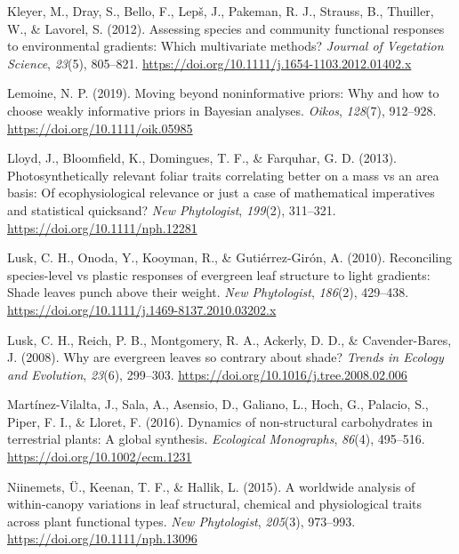 \documentclass[
  12pt,
  a4paper,
,tablecaptionabove
]{scrartcl}
\newlength{\cslhangindent}
\newenvironment{CSLReferences}[2] %
 {%
  \setlength{\parindent}{0pt}
  \ifodd #1 \everypar{\setlength{\hangindent}{\cslhangindent}}\ignorespaces\fi
  \ifnum #2 > 0
  \setlength{\parskip}{#2\baselineskip}
  \fi
 }%
 {}
\begin{document}
\begin{CSLReferences}{1}{0}
\leavevmode{}%
Kleyer, M., Dray, S., Bello, F., Lepš, J., Pakeman, R. J., Strauss, B.,
Thuiller, W., \& Lavorel, S. (2012). Assessing species and community
functional responses to environmental gradients: {Which} multivariate
methods? \emph{Journal of Vegetation Science}, \emph{23}(5), 805--821.
\url{https://doi.org/10.1111/j.1654-1103.2012.01402.x}

\leavevmode{}%
Lemoine, N. P. (2019). Moving beyond noninformative priors: Why and how
to choose weakly informative priors in {Bayesian} analyses.
\emph{Oikos}, \emph{128}(7), 912--928.
\url{https://doi.org/10.1111/oik.05985}

\leavevmode{}%
Lloyd, J., Bloomfield, K., Domingues, T. F., \& Farquhar, G. D. (2013).
Photosynthetically relevant foliar traits correlating better on a mass
vs an area basis: {Of} ecophysiological relevance or just a case of
mathematical imperatives and statistical quicksand? \emph{New
Phytologist}, \emph{199}(2), 311--321.
\url{https://doi.org/10.1111/nph.12281}

\leavevmode{}%
Lusk, C. H., Onoda, Y., Kooyman, R., \& Gutiérrez-Girón, A. (2010).
Reconciling species-level vs plastic responses of evergreen leaf
structure to light gradients: {Shade} leaves punch above their weight.
\emph{New Phytologist}, \emph{186}(2), 429--438.
\url{https://doi.org/10.1111/j.1469-8137.2010.03202.x}

\leavevmode{}%
Lusk, C. H., Reich, P. B., Montgomery, R. A., Ackerly, D. D., \&
Cavender-Bares, J. (2008). Why are evergreen leaves so contrary about
shade? \emph{Trends in Ecology and Evolution}, \emph{23}(6), 299--303.
\url{https://doi.org/10.1016/j.tree.2008.02.006}

\leavevmode{}%
Martínez-Vilalta, J., Sala, A., Asensio, D., Galiano, L., Hoch, G.,
Palacio, S., Piper, F. I., \& Lloret, F. (2016). Dynamics of
non-structural carbohydrates in terrestrial plants: A global synthesis.
\emph{Ecological Monographs}, \emph{86}(4), 495--516.
\url{https://doi.org/10.1002/ecm.1231}

\leavevmode{}%
Niinemets, Ü., Keenan, T. F., \& Hallik, L. (2015). A worldwide analysis
of within-canopy variations in leaf structural, chemical and
physiological traits across plant functional types. \emph{New
Phytologist}, \emph{205}(3), 973--993.
\url{https://doi.org/10.1111/nph.13096}


\end{CSLReferences}
\end{document}
